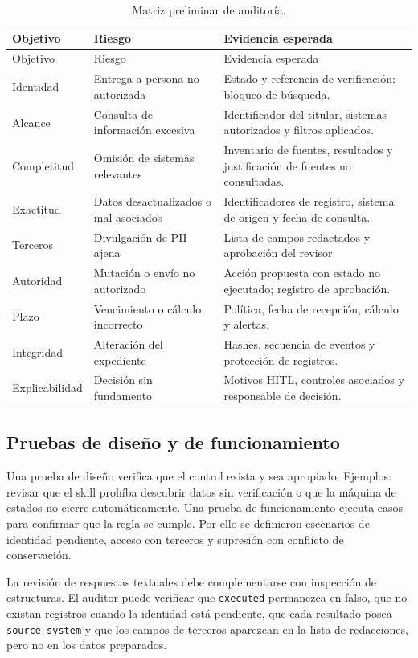 \documentclass[11pt,a4paper]{article}
\begin{document}
\begin{longtable}{p{3cm}p{5.2cm}p{6.3cm}}
\caption{Matriz preliminar de auditoría.}\label{tab:audit-matrix}\\
\toprule
Objetivo & Riesgo & Evidencia esperada \\
\midrule
\endfirsthead
\toprule
Objetivo & Riesgo & Evidencia esperada \\
\midrule
\endhead
Identidad & Entrega a persona no autorizada & Estado y referencia de verificación; bloqueo de búsqueda. \\
Alcance & Consulta de información excesiva & Identificador del titular, sistemas autorizados y filtros aplicados. \\
Completitud & Omisión de sistemas relevantes & Inventario de fuentes, resultados y justificación de fuentes no consultadas. \\
Exactitud & Datos desactualizados o mal asociados & Identificadores de registro, sistema de origen y fecha de consulta. \\
Terceros & Divulgación de PII ajena & Lista de campos redactados y aprobación del revisor. \\
Autoridad & Mutación o envío no autorizado & Acción propuesta con estado no ejecutado; registro de aprobación. \\
Plazo & Vencimiento o cálculo incorrecto & Política, fecha de recepción, cálculo y alertas. \\
Integridad & Alteración del expediente & Hashes, secuencia de eventos y protección de registros. \\
Explicabilidad & Decisión sin fundamento & Motivos HITL, controles asociados y responsable de decisión. \\
\bottomrule
\end{longtable}

\subsection{Pruebas de diseño y de funcionamiento}

Una prueba de diseño verifica que el control exista y sea apropiado. Ejemplos: revisar que el skill prohíba descubrir datos sin verificación o que la máquina de estados no cierre automáticamente. Una prueba de funcionamiento ejecuta casos para confirmar que la regla se cumple. Por ello se definieron escenarios de identidad pendiente, acceso con terceros y supresión con conflicto de conservación.

La revisión de respuestas textuales debe complementarse con inspección de estructuras. El auditor puede verificar que \texttt{executed} permanezca en falso, que no existan registros cuando la identidad está pendiente, que cada resultado posea \texttt{source\_system} y que los campos de terceros aparezcan en la lista de redacciones, pero no en los datos preparados.
\end{document}
